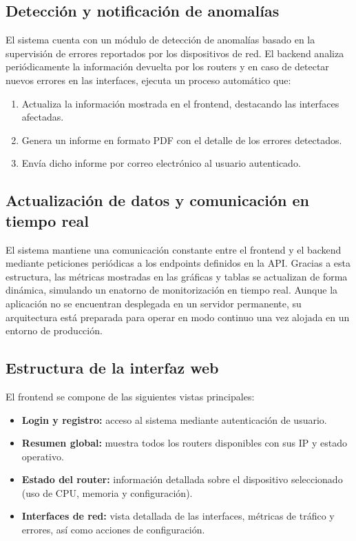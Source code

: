 \subsection*{Detección y notificación de anomalías}

El sistema cuenta con un módulo de detección de anomalías basado en la supervisión de errores reportados por los dispositivos de red. El backend analiza periódicamente la información devuelta por los routers y en caso de detectar nuevos errores en las interfaces, ejecuta un proceso automático que:

\begin{enumerate}
    \item Actualiza la información mostrada en el frontend, destacando las interfaces afectadas.
    \item Genera un informe en formato PDF con el detalle de los errores detectados.
    \item Envía dicho informe por correo electrónico al usuario autenticado.
\end{enumerate}

\subsection*{Actualización de datos y comunicación en tiempo real}

El sistema mantiene una comunicación constante entre el frontend y el backend mediante peticiones periódicas a los endpoints definidos en la API. Gracias a esta estructura, las métricas mostradas en las gráficas y tablas se actualizan de forma dinámica, simulando un enatorno de monitorización en tiempo real. Aunque la aplicación no se encuentran desplegada en un servidor permanente, su arquitectura está preparada para operar en modo continuo una vez alojada en un entorno de producción.

\subsection*{Estructura de la interfaz web}

El frontend se compone de las siguientes vistas principales:

\begin{itemize}
    \item \textbf{Login y registro:} acceso al sistema mediante autenticación de usuario.
    \item \textbf{Resumen global:} muestra todos los routers disponibles con sus IP y estado operativo.
    \item \textbf{Estado del router:} información detallada sobre el dispositivo seleccionado (uso de CPU, memoria y configuración).
    \item \textbf{Interfaces de red:} vista detallada de las interfaces, métricas de tráfico y errores, así como acciones de configuración.
\end{itemize}

